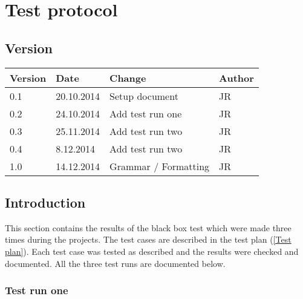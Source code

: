 \chapter{Test protocol} %

\label{Test protocol} %



\section{Version}

\begin{tabular}{| p{1.5cm} | p{2cm} | p{9cm} | p{1.5cm} |}
    \hline
    Version & Date      & Change & Author \\ \hline
    0.1     & 20.10.2014        & Setup document                                        & JR \\ \hline
    0.2     & 24.10.2014        & Add test run one                                        & JR \\ \hline
    0.3     & 25.11.2014        & Add test run two                                        & JR \\ \hline
    0.4     & 8.12.2014        & Add test run two                                        & JR \\ \hline
    1.0     & 14.12.2014        & Grammar / Formatting                                        & JR \\ \hline
\end{tabular}


\section{Introduction}

This section contains the results of the black box test which were made three times during the projects. The test cases are described in the test plan (\ref{Test plan}). Each test case was tested as described and the results were checked and documented. All the three test runs are documented below.

	\subsection{Test run one}

